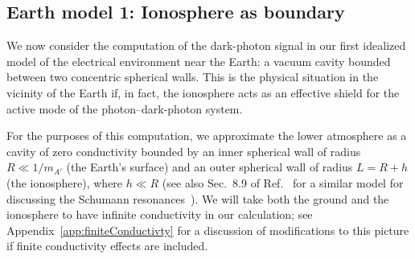 \documentclass[amsmath,amssymb,aps,10pt,prd,letterpaper,nofootinbib,balancelastpage,notitlepage,superscriptaddress,twocolumn,floatfix]{revtex4-2}
\newcommand{\appref}[2][x]{Appendi{#1}~\ref{#2}}	%
\newcommand{\citeR}[2][]{Ref{#1}.~\cite{#2}}		%
\begin{document}
\subsection{Earth model 1: Ionosphere as boundary}
\label{sec:earthTheory}

We now consider the computation of the dark-photon signal in our first idealized model of the electrical environment near the Earth: a vacuum cavity bounded between two concentric spherical walls.
This is the physical situation in the vicinity of the Earth if, in fact, the ionosphere acts as an effective shield for the active mode of the photon--dark-photon system.

For the purposes of this computation, we approximate the lower atmosphere as a cavity of zero conductivity bounded by an inner spherical wall of radius $R\ll 1/m_{A'}$ (the Earth's surface) and an outer spherical wall of radius $L=R+h$ (the ionosphere), where $h\ll R$ (see also Sec.~8.9 of \citeR{Jackson} for a similar model for discussing the Schumann resonances~\cite{Schumann+1952+149+154}).
We will take both the ground and the ionosphere to have infinite conductivity in our calculation; see \appref{app:finiteConductivty} for a discussion of modifications to this picture if finite conductivity effects are included.
\end{document}
